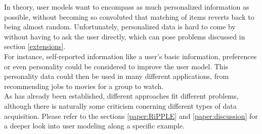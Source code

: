 \documentclass[conference]{IEEEtran}
\begin{document}
In theory, user models want to encompass as much personalized information as possible, without becoming so convoluted that matching of items reverts back to being almost random. \cite{olakanmi2017group} Unfortunately, personalized data is hard to come by without having to ask the user directly, which can pose problems discussed in section \ref{extensions}.\\
For instance, self-reported information like a user's basic information, preferences or even personality could be considered to improve the user model. \cite{nunes2012personality} This personality data could then be used in many different applications, from recommending jobs to movies for a group to watch. \cite{costa1995persons, recio2009personality}\\
As has already been established, different approaches fit different problems, although there is naturally some criticism conerning different types of data acquisition. Please refer to the sections \ref{paper:RiPPLE} and \ref{paper:discussion} for a deeper look into user modeling along a specific example.\\
\end{document}
